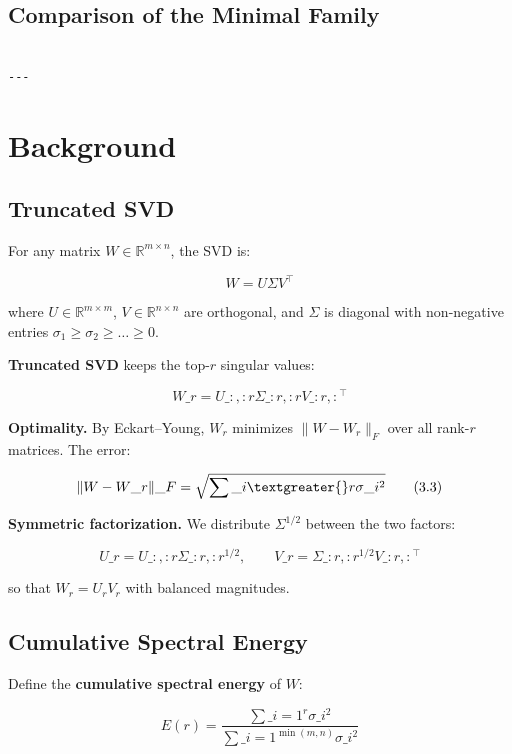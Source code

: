 \subsection{Comparison of the Minimal Family}

\begin{lstlisting}

---
\end{lstlisting}


\section{Background}

\subsection{Truncated SVD}

For any matrix $W \in \mathbb{R}^{m \times n}$, the SVD is:

\[
W = U \Sigma V^\top
\tag{3.1}
\]

where $U \in \mathbb{R}^{m \times m}$, $V \in \mathbb{R}^{n \times n}$ are 
orthogonal, and $\Sigma$ is diagonal with non-negative entries 
$\sigma_1 \geq \sigma_2 \geq \dots \geq 0$.

\textbf{Truncated SVD} keeps the top-$r$ singular values:

\[
W\_r = U\_{:, :r} \Sigma\_{:r, :r} V\_{:r, :}^\top
\tag{3.2}
\]

\textbf{Optimality.} By Eckart--Young, $W_r$ minimizes $\|W - W_r\|_F$ over all 
rank-$r$ matrices. The error:

\[
\|W - W\_r\|\_F = \sqrt{\sum\_{i \textgreater{} r} \sigma\_i^2}
\tag{3.3}
\]

\textbf{Symmetric factorization.} We distribute $\Sigma^{1/2}$ between the two 
factors:

\[
U\_r = U\_{:, :r} \Sigma\_{:r, :r}^{1/2}, \qquad
V\_r = \Sigma\_{:r, :r}^{1/2} V\_{:r, :}^\top
\tag{3.4}
\]

so that $W_r = U_r V_r$ with balanced magnitudes.

\subsection{Cumulative Spectral Energy}

Define the \textbf{cumulative spectral energy} of $W$:

\[
E(r) = \frac{\sum\_{i=1}^{r} \sigma\_i^2}{\sum\_{i=1}^{\min(m, n)} \sigma\_i^2}
\tag{3.5}
\]

